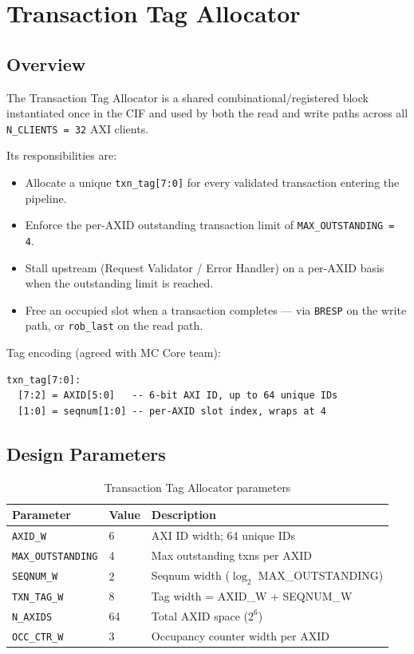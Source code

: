 \section{Transaction Tag Allocator}
\subsection{Overview}

The Transaction Tag Allocator is a shared combinational/registered block
instantiated once in the CIF and used by both the read and write paths
across all \texttt{N\_CLIENTS = 32} AXI clients.

Its responsibilities are:
\begin{itemize}
  \item Allocate a unique \texttt{txn\_tag[7:0]} for every validated
        transaction entering the pipeline.
  \item Enforce the per-AXID outstanding transaction limit of
        \texttt{MAX\_OUTSTANDING = 4}.
  \item Stall upstream (Request Validator / Error Handler) on a per-AXID
        basis when the outstanding limit is reached.
  \item Free an occupied slot when a transaction completes — via
        \texttt{BRESP} on the write path, or \texttt{rob\_last} on the
        read path.
\end{itemize}

Tag encoding (agreed with MC Core team):
\begin{lstlisting}
txn_tag[7:0]:
  [7:2] = AXID[5:0]   -- 6-bit AXI ID, up to 64 unique IDs
  [1:0] = seqnum[1:0] -- per-AXID slot index, wraps at 4
\end{lstlisting}

\subsection{Design Parameters}

\begin{table}[h!]
\centering
\begin{tabular}{lll}
\toprule
\textbf{Parameter} & \textbf{Value} & \textbf{Description} \\
\midrule
\texttt{AXID\_W}           & 6   & AXI ID width; 64 unique IDs \\
\texttt{MAX\_OUTSTANDING}  & 4   & Max outstanding txns per AXID \\
\texttt{SEQNUM\_W}         & 2   & Seqnum width (\(\log_2\) MAX\_OUTSTANDING) \\
\texttt{TXN\_TAG\_W}       & 8   & Tag width = AXID\_W + SEQNUM\_W \\
\texttt{N\_AXIDS}          & 64  & Total AXID space ($2^6$) \\
\texttt{OCC\_CTR\_W}       & 3   & Occupancy counter width per AXID \\
\bottomrule
\end{tabular}
\caption{Transaction Tag Allocator parameters}
\end{table}

